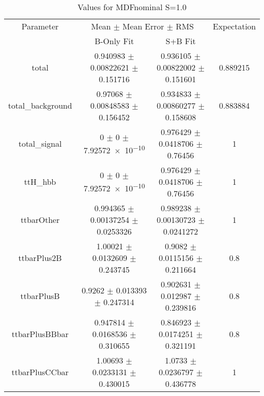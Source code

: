 \begin{table}
\centering
\caption{Values for MDFnominal S=1.0}
\begin{tabular}{cccc}
\toprule
Parameter & \multicolumn{2}{c}{Mean $\pm$ Mean Error $\pm$ RMS} & Expectation\\
 & B-Only Fit & S+B Fit & \\
\midrule
total & \num{0.940983} $\pm$ \num{0.00822621} $\pm$ \num{0.151716} & \num{0.936105} $\pm$ \num{0.00822002} $\pm$ \num{0.151601} & \num{0.889215}\\
total\_background & \num{0.97068} $\pm$ \num{0.00848583} $\pm$ \num{0.156452} & \num{0.934833} $\pm$ \num{0.00860277} $\pm$ \num{0.158608} & \num{0.883884}\\
total\_signal & \num{0} $\pm$ \num{0} $\pm$ \num{7.92572e-10} & \num{0.976429} $\pm$ \num{0.0418706} $\pm$ \num{0.76456} & \num{1}\\
ttH\_hbb & \num{0} $\pm$ \num{0} $\pm$ \num{7.92572e-10} & \num{0.976429} $\pm$ \num{0.0418706} $\pm$ \num{0.76456} & \num{1}\\
ttbarOther & \num{0.994365} $\pm$ \num{0.00137254} $\pm$ \num{0.0253326} & \num{0.989238} $\pm$ \num{0.00130723} $\pm$ \num{0.0241272} & \num{1}\\
ttbarPlus2B & \num{1.00021} $\pm$ \num{0.0132609} $\pm$ \num{0.243745} & \num{0.9082} $\pm$ \num{0.0115156} $\pm$ \num{0.211664} & \num{0.8}\\
ttbarPlusB & \num{0.9262} $\pm$ \num{0.013393} $\pm$ \num{0.247314} & \num{0.902631} $\pm$ \num{0.012987} $\pm$ \num{0.239816} & \num{0.8}\\
ttbarPlusBBbar & \num{0.947814} $\pm$ \num{0.0168536} $\pm$ \num{0.310655} & \num{0.846923} $\pm$ \num{0.0174251} $\pm$ \num{0.321191} & \num{0.8}\\
ttbarPlusCCbar & \num{1.00693} $\pm$ \num{0.0233131} $\pm$ \num{0.430015} & \num{1.0733} $\pm$ \num{0.0236797} $\pm$ \num{0.436778} & \num{1}\\
\bottomrule
\end{tabular}
\end{table}
